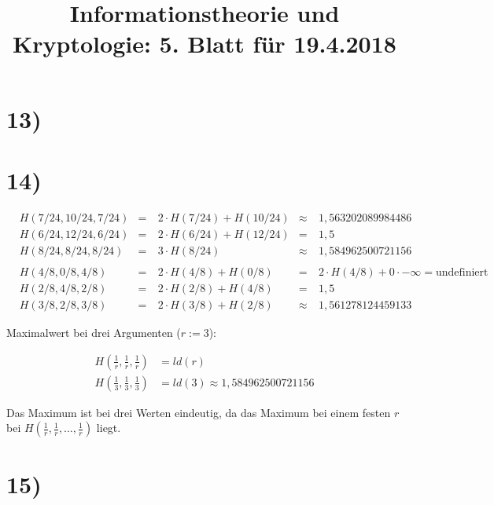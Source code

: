 \documentclass[11pt,a4paper]{article}
\begin{document}
  \title{Informationstheorie und Kryptologie: 5. Blatt für 19.4.2018}
  \maketitle

  \section*{13)}

  

  \section*{14)}

  \begin{align*}
    & H(7/24, 10/24, 7/24) &=\ &2 \cdot H(7/24) + H(10/24) &\approx&\ 1,563202089984486 \\
    & H(6/24, 12/24, 6/24) &=\ &2 \cdot H(6/24) + H(12/24) &=&\       1,5 \\
    & H(8/24, 8/24, 8/24)  &=\ &3 \cdot H(8/24)            &\approx&\ 1,584962500721156
    \\
    \\
    & H(4/8, 0/8, 4/8) &=\ &2 \cdot H(4/8) + H(0/8)        &=&\       2 \cdot H(4/8) + 0 \cdot -\infty = \text{undefiniert} \\
    & H(2/8, 4/8, 2/8) &=\ &2 \cdot H(2/8) + H(4/8)        &=&\       1,5 \\
    & H(3/8, 2/8, 3/8) &=\ &2 \cdot H(3/8) + H(2/8)        &\approx&\ 1,561278124459133
  \end{align*}

  Maximalwert bei drei Argumenten ($r := 3$):

  \begin{align*}
    H(\frac{1}{r}, \frac{1}{r}, \frac{1}{r}) &= ld(r) \\
    H(\frac{1}{3}, \frac{1}{3}, \frac{1}{3}) &= ld(3) \approx 1,584962500721156
  \end{align*}

  Das Maximum ist bei drei Werten eindeutig, da das Maximum bei einem festen $r$ bei $H(\frac{1}{r},\frac{1}{r},\dots,\frac{1}{r})$ liegt.

  \section*{15)}
\end{document}
